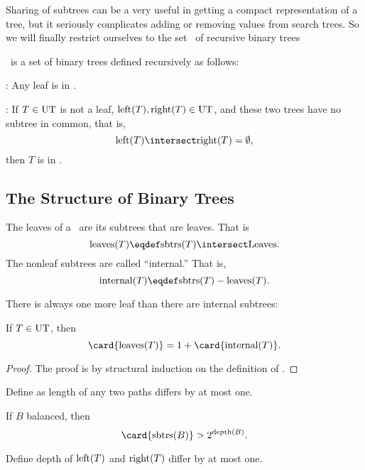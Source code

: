 Sharing of subtrees can be a very useful in getting a compact
representation of a tree, but it seriously complicates adding or
removing values from search trees.  So we will finally restrict
ourselves to the set \ubt\ of  recursive binary trees
\fi


\begin{definition}
\ubt\ is a set of binary trees defined recursively as follows:

:  Any leaf is in \ubt.

: If $T \in \ubt$ is not a leaf,
$\text{left}(T), \text{right}(T) \in \text{UT}$, and these two trees
have no subtree in common, that is,
\[
\leftsub{T} \intersect \rightsub{T} = \emptyset,
\]
then $T$ is in \ubt.
\end{definition}

\iffalse
Now we can replace the `$\leq$'' in the proof of
Lemma~\ref{lem:finsubtrees}, namely,
\[
\card{\subtr{T}} = 1 + \card{\subtr{leftsub{T}}} + \card{\subtr{leftsub{T}}}.
\]
for all $T \in \ubt$.
\fi

\subsection{The Structure of Binary Trees}

The leaves of a \rectree\ are its subtrees that are leaves.  That is
\[
\text{leaves}(T) \eqdef \subtr{T} \intersect \leafset.
\]
The nonleaf subtrees are called ``internal.''  That is,
\[
\text{internal}(T) \eqdef \subtr{T} - \text{leaves}(T).
\]

There is always one more leaf than there are internal subtrees:

\begin{lemma}\label{}
If $T \in \ubt$, then
\[
\card{\text{leaves}(T)} = 1 + \card{\text{internal}(T)}.
\]
\end{lemma}
\begin{proof}
The proof is by structural induction on the definition of \ubt.

\end{proof} 

Define  as length of any two paths differs by at
most one.

\begin{lemma}\label{}
If $B$ balanced, then
\[
\card{\subtr{B}} > 2^{\text{depth}(B)}.
\]
\end{lemma}

Define  depth of $\text{left}(T)$ and $\text{right}(T)$
differ by at most one.

